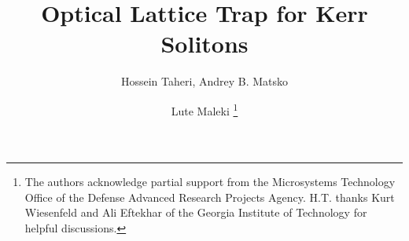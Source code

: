 





\usepackage{mathtools}

\newcommand{\difdisp}[2]{\frac{\mathrm{d}#1}{\mathrm{d}#2}} %
\newcommand{\difil}[2]{\mathrm{d}#1/\mathrm{d}#2} %
\newcommand{\pdifdisp}[2]{\frac{\partial #1}{\partial #2}}
\newcommand{\pdifil}[2]{\partial #1/\partial #2}

\newcommand{\e}[0]{\mathrm{e}}
\newcommand{\imi}[0]{\mathrm{i}} %
\newcommand{\difd}[0]{\mathrm{d}} %

\newcommand{\floor}[1]{\lfloor #1 \rfloor} %
\DeclarePairedDelimiter\bra{\langle}{\rvert}
\DeclarePairedDelimiter\ket{\lvert}{\rangle}
\DeclarePairedDelimiterX{}
\DeclarePairedDelimiter\abs{\lvert}{\rvert}%







%
\title{Optical Lattice Trap for Kerr Solitons}
\author{Hossein Taheri, Andrey B. Matsko \and Lute Maleki%
\thanks{The authors acknowledge partial support from the Microsystems Technology Office of the Defense Advanced Research Projects Agency. H.T. thanks Kurt Wiesenfeld and Ali Eftekhar of the Georgia Institute of Technology for helpful discussions.
}%
}

